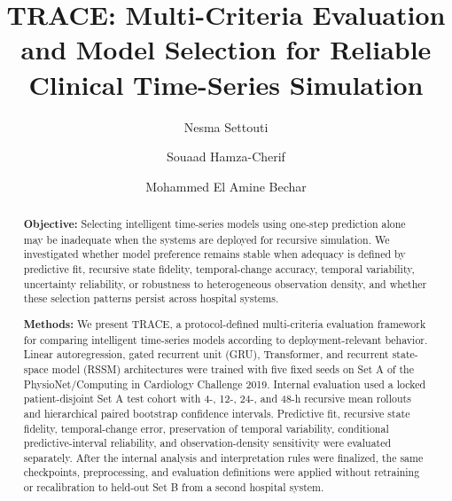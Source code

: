 \documentclass[preprint,12pt]{elsarticle}
\begin{document}
\setlength{\emergencystretch}{2em}
\begin{frontmatter}

\title{TRACE: Multi-Criteria Evaluation and Model Selection for Reliable Clinical Time-Series Simulation}

\author[aff1]{Nesma Settouti}
\author[aff2]{Souaad Hamza-Cherif}
\author[aff3]{Mohammed El Amine Bechar}
\address[aff1]{LabISEN, LSL, ISEN Ouest, Caen, France}
\address[aff2]{Biomedical Engineering Laboratory, Tlemcen University, Tlemcen, Algeria}
\address[aff3]{LabISEN, LSL, ISEN Ouest, Brest, France}

\begin{abstract}

\textbf{Objective:}
Selecting intelligent time-series models using one-step prediction alone may be inadequate when the systems are deployed for recursive simulation. We investigated whether model preference remains stable when adequacy is defined by predictive fit, recursive state fidelity, temporal-change accuracy, temporal variability, uncertainty reliability, or robustness to heterogeneous observation density, and whether these selection patterns persist across hospital systems.

\textbf{Methods:}
We present TRACE, a protocol-defined multi-criteria evaluation framework for comparing intelligent time-series models according to deployment-relevant behavior. Linear autoregression, gated recurrent unit (GRU), Transformer, and recurrent state-space model (RSSM) architectures were trained with five fixed seeds on Set A of the PhysioNet/Computing in Cardiology Challenge 2019. Internal evaluation used a locked patient-disjoint Set A test cohort with 4-, 12-, 24-, and 48-h recursive mean rollouts and hierarchical paired bootstrap confidence intervals. Predictive fit, recursive state fidelity, temporal-change error, preservation of temporal variability, conditional predictive-interval reliability, and observation-density sensitivity were evaluated separately. After the internal analysis and interpretation rules were finalized, the same checkpoints, preprocessing, and evaluation definitions were applied without retraining or recalibration to held-out Set B from a second hospital system.


\end{abstract}
\end{frontmatter}
\end{document}
